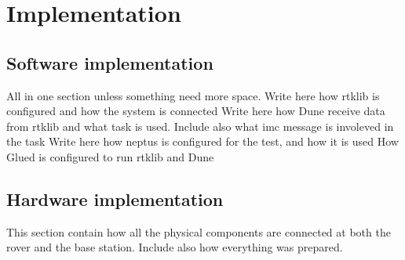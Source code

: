 \chapter{Implementation}

\section{Software implementation}

All in one section unless something need more space.
Write here how rtklib is configured and how the system is connected
Write here how Dune receive data from rtklib and what task is used. Include also what imc message is involeved in the task
Write here how neptus is configured for the test, and how it is used
How Glued is configured to run rtklib and Dune
\section{Hardware implementation}
This section contain how all the physical components are connected at both the rover and the base station. Include also how everything was prepared.